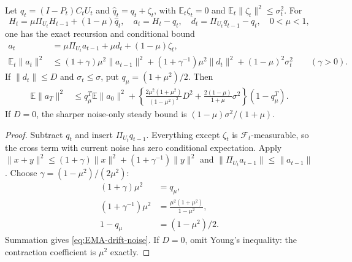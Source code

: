 \begin{proposition}
\label{prop:tracker-momentum-error}
Let $q_t=(I-P_t)C_tU_t$ and
$\widehat q_t=q_t+\zeta_t$, with
$\mathbb E_t\zeta_t=0$ and $\mathbb E_t\|\zeta_t\|^2\le\sigma_t^2$.
For
\begin{equation}
 H_t=\mu\Pi_{U_t}H_{t-1}+(1-\mu)\widehat q_t,\quad
 a_t=H_t-q_t,\quad
 d_t=\Pi_{U_t}q_{t-1}-q_t,\quad0<\mu<1,
\end{equation}
one has the exact recursion and conditional bound
\begin{align}
 a_t&=\mu\Pi_{U_t}a_{t-1}+\mu d_t+(1-\mu)\zeta_t,\\
 \mathbb E_t\|a_t\|^2
 &\le(1+\gamma)\mu^2\|a_{t-1}\|^2
      +(1+\gamma^{-1})\mu^2\|d_t\|^2
      +(1-\mu)^2\sigma_t^2\qquad(\gamma>0).\label{eq:EMA-full-recursion}
\end{align}
If $\|d_t\|\le D$ and $\sigma_t\le\sigma$, put
$q_\mu=(1+\mu^2)/2$. Then
\begin{align}
 \mathbb E\|a_T\|^2
 &\le q_\mu^T\mathbb E\|a_0\|^2
  +\left\{\frac{2\mu^2(1+\mu^2)}{(1-\mu^2)^2}D^2
             +\frac{2(1-\mu)}{1+\mu}\sigma^2\right\}(1-q_\mu^T).
 \label{eq:EMA-drift-noise}
\end{align}
If $D=0$, the sharper noise-only steady bound is
$(1-\mu)\sigma^2/(1+\mu)$.
\end{proposition}
\begin{proof}
Subtract $q_t$ and insert $\Pi_{U_t}q_{t-1}$.
Everything except $\zeta_t$ is $\mathcal F_t$-measurable, so the cross
term with current noise has zero conditional expectation. Apply
$\|x+y\|^2\le(1+\gamma)\|x\|^2+(1+\gamma^{-1})\|y\|^2$
and $\|\Pi_{U_t}a_{t-1}\|\le\|a_{t-1}\|$.
Choose $\gamma=(1-\mu^2)/(2\mu^2)$:
\begin{align}
 (1+\gamma)\mu^2&=q_\mu,\\
 (1+\gamma^{-1})\mu^2&=\frac{\mu^2(1+\mu^2)}{1-\mu^2},\\
 1-q_\mu&=(1-\mu^2)/2.
\end{align}
Summation gives \eqref{eq:EMA-drift-noise}. If $D=0$, omit Young's
inequality: the contraction coefficient is $\mu^2$ exactly.
\end{proof}

